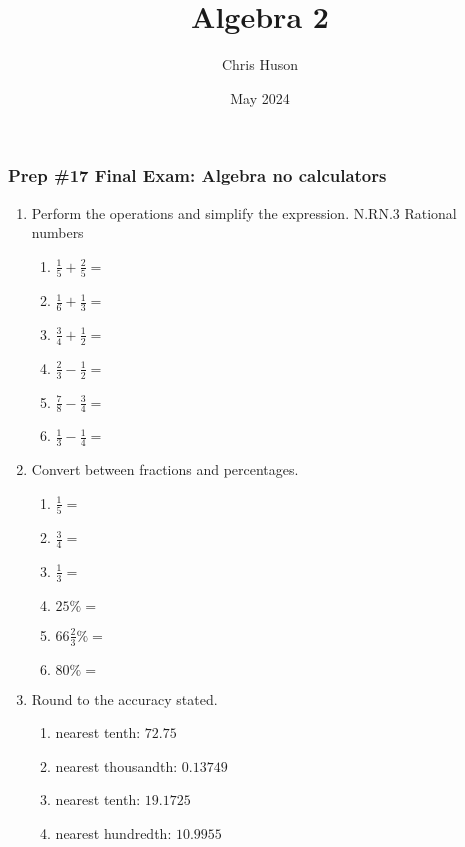 \documentclass[12pt, twoside]{article}
\title{Algebra 2}
\author{Chris Huson}
\date{May 2024}
\begin{document}
\subsubsection*{Prep \#17 Final Exam: Algebra \hfill no calculators}
\begin{enumerate}[itemsep=0.5cm]

\item Perform the operations and simplify the expression. \hfill N.RN.3 Rational numbers
    \begin{multicols}{2}
    \begin{enumerate}[itemsep=0.5cm]
        \item $\displaystyle \frac{1}{5} + \frac{2}{5} =$
        \item $\displaystyle \frac{1}{6} + \frac{1}{3} =$
        \item $\displaystyle \frac{3}{4} + \frac{1}{2} =$
        \item $\displaystyle \frac{2}{3} - \frac{1}{2} =$
        \item $\displaystyle \frac{7}{8} - \frac{3}{4} =$
        \item $\displaystyle \frac{1}{3} - \frac{1}{4} =$
    \end{enumerate}
    \end{multicols}

\item Convert between fractions and percentages.
    \begin{multicols}{2}
    \begin{enumerate}[itemsep=0.5cm]
        \item $\frac{1}{5}=$
        \item $\frac{3}{4}=$
        \item $\frac{1}{3}=$
        \item $25\% =$
        \item $66 \frac{2}{3}\% =$
        \item $80\% =$
    \end{enumerate}
    \end{multicols}

\item Round to the accuracy stated.
    \begin{multicols}{2}
    \begin{enumerate}[itemsep=1cm]
        \item nearest tenth: $72.75$
        \item nearest thousandth: $0.13749$
        \item nearest tenth: $19.1725$
        \item nearest hundredth: $10.9955$
    \end{enumerate}
    \end{multicols} \vspace{1cm}


\end{enumerate}
\end{document}
